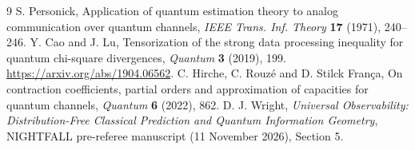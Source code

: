 \documentclass[11pt]{article}
\begin{document}
\begin{thebibliography}{9}\small
{} S. Personick, Application of quantum estimation theory to analog communication over quantum channels, \emph{IEEE Trans. Inf. Theory} \textbf{17} (1971), 240--246.
 Y. Cao and J. Lu, Tensorization of the strong data processing inequality for quantum chi-square divergences, \emph{Quantum} \textbf{3} (2019), 199. \url{https://arxiv.org/abs/1904.06562}.
 C. Hirche, C. Rouz\'e and D. Stilck Fran\c ca, On contraction coefficients, partial orders and approximation of capacities for quantum channels, \emph{Quantum} \textbf{6} (2022), 862.
 D. J. Wright, \emph{Universal Observability: Distribution-Free Classical Prediction and Quantum Information Geometry}, NIGHTFALL pre-referee manuscript (11 November 2026), Section 5.
\end{thebibliography}
\end{document}
